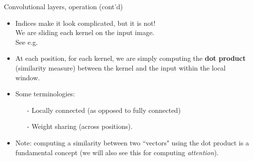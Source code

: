 \begin{frame}{Convolutional layers, operation (cont'd)}
\begin{itemize}
\item Indices make it look complicated, but it is not!\\
 We are sliding each kernel on the input image.\\
See e.g. 
\item At each position, for each kernel, we are simply
computing the \textbf{dot product} (similarity measure) between the kernel and the input within the local window.
\item Some terminologies: 
\begin{itemize}
\item[-] Locally connected (as opposed to fully connected)
\item[-] Weight sharing (across positions).
\end{itemize}
\item Note: computing a similarity between two ``vectors" using the dot product is a fundamental concept (we will also see this for computing \textit{attention}). 
\end{itemize}
\end{frame}

